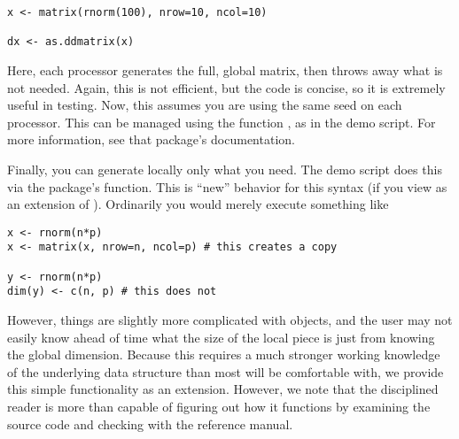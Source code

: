 \begin{lstlisting}[language=rr]
x <- matrix(rnorm(100), nrow=10, ncol=10)

dx <- as.ddmatrix(x)
\end{lstlisting}

Here, each processor generates the full, global matrix, then throws away what is not needed.  Again, this is not efficient, but the code is concise, so it is extremely useful in testing.  Now, this assumes you are using the same seed on each processor.  This can be managed using the  function , as in the demo script.  For more information, see that package's documentation.

Finally, you can generate locally only what you need.  The demo script does this via the  package's  function.  This is ``new'' behavior for this syntax (if you view  as an extension of ).  Ordinarily you would merely execute something like
\begin{lstlisting}[language=rr,title=Creating a random normal matrix in serial R]
x <- rnorm(n*p)
x <- matrix(x, nrow=n, ncol=p) # this creates a copy

y <- rnorm(n*p)
dim(y) <- c(n, p) # this does not
\end{lstlisting}
However, things are slightly more complicated with  objects, and the user may not easily know ahead of time what the size of the local piece is just from knowing the global dimension.  Because this requires a much stronger working knowledge of the underlying data structure than most will be comfortable with, we provide this simple functionality as an extension.  However, we note that the disciplined reader is more than capable of figuring out how it functions by examining the source code and checking with the reference manual.
% 
% 





